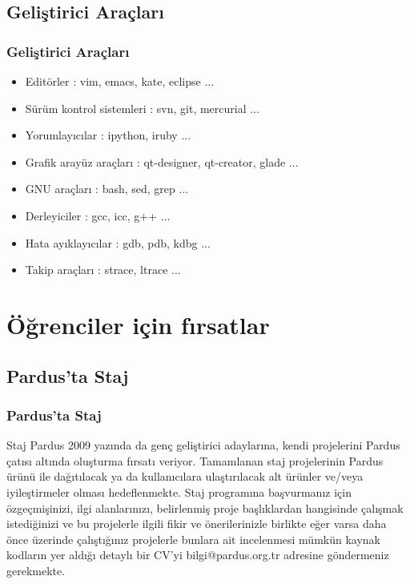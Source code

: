 \documentclass{beamer}
\begin{document}
\subsection{Geliştirici Araçları}
\frame
{
    \frametitle{Geliştirici Araçları}
	\begin{itemize}
        \item Editörler : vim, emacs, kate, eclipse ...
        \item Sürüm kontrol sistemleri : svn, git, mercurial ...
        \item Yorumlayıcılar : ipython, iruby ...
        \item Grafik arayüz araçları : qt-designer, qt-creator, glade ...
        \item GNU araçları : bash, sed, grep ...
        \item Derleyiciler : gcc, icc, g++ ...
        \item Hata ayıklayıcılar : gdb, pdb, kdbg ...
        \item Takip araçları : strace, ltrace ...
	\end{itemize}
}

\section{Öğrenciler için fırsatlar}

\subsection{Pardus'ta Staj}
\frame
{
    \frametitle{Pardus'ta Staj}
    \begin{block}{Staj}
        Pardus 2009 yazında da genç geliştirici adaylarına, kendi projelerini Pardus çatısı altında oluşturma fırsatı veriyor. Tamamlanan staj projelerinin Pardus ürünü ile dağıtılacak ya da kullanıcılara ulaştırılacak alt ürünler ve/veya iyileştirmeler olması hedeflenmekte.
        Staj programına başvurmanız için özgeçmişinizi, ilgi alanlarınızı, belirlenmiş proje başlıklardan hangisinde çalışmak istediğinizi ve bu projelerle ilgili fikir ve önerilerinizle birlikte eğer varsa daha önce üzerinde çalıştığınız projelerle bunlara ait incelenmesi mümkün kaynak kodların yer aldığı detaylı bir CV'yi bilgi@pardus.org.tr adresine göndermeniz gerekmekte.
    \end{block}
}
\end{document}
